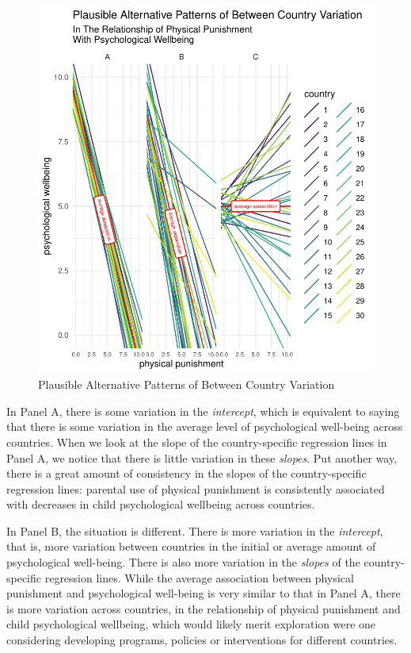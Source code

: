 \documentclass[
  letterpaper,
  DIV=11,
  numbers=noendperiod]{scrreprt}
\begin{document}
\begin{figure}

{\centering \includegraphics{./conceptual-framework_files/figure-pdf/fig-variation1-1.pdf}

}

\caption{\label{fig-variation1}Plausible Alternative Patterns of Between
Country Variation}

\end{figure}

In Panel A, there is some variation in the \emph{intercept}, which is
equivalent to saying that there is some variation in the average level
of psychological well-being across countries. When we look at the slope
of the country-specific regression lines in Panel A, we notice that
there is little variation in these \emph{slopes}. Put another way, there
is a great amount of consistency in the slopes of the country-specific
regression lines: parental use of physical punishment is consistently
associated with decreases in child psychological wellbeing across
countries.

In Panel B, the situation is different. There is more variation in the
\emph{intercept}, that is, more variation between countries in the
initial or average amount of psychological well-being. There is also
more variation in the \emph{slopes} of the country-specific regression
lines. While the average association between physical punishment and
psychological well-being is very similar to that in Panel A, there is
more variation across countries, in the relationship of physical
punishment and child psychological wellbeing, which would likely merit
exploration were one considering developing programs, policies or
interventions for different countries.
\end{document}
